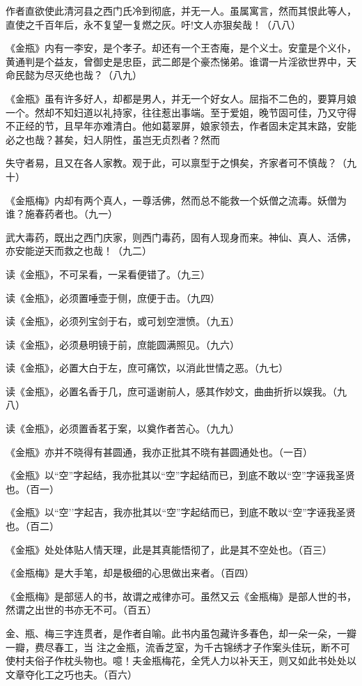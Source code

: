 \begin{showcontents}{}
{作者直欲使此清河县之西门氏冷到彻底，并无一人。虽属寓言，然而其恨此等人，直使之千百年后，永不复望一复燃之灰。吁!文人亦狠矣哉！（八八）

《金瓶》内有一李安，是个孝子。却还有一个王杏庵，是个义士。安童是个义仆，黄通判是个益友，曾御史是忠臣，武二郎是个豪杰悌弟。谁谓一片淫欲世界中，天命民懿为尽灭绝也哉？（八九）

《金瓶》虽有许多好人，却都是男人，并无一个好女人。屈指不二色的，要算月娘一个。然却不知妇道以礼持家，往往惹出事端。至于爱姐，晚节固可佳，乃又守得不正经的节，且早年亦难清白。他如葛翠屏，娘家领去，作者固未定其末路，安能必之也哉？甚矣，妇人阴性，虽岂无贞烈者？然而

失守者易，且又在各人家教。观于此，可以禀型于之惧矣，齐家者可不慎哉？（九十）

《金瓶梅》内却有两个真人，一尊活佛，然而总不能救一个妖僧之流毒。妖僧为谁？施春药者也。（九一）

武大毒药，既出之西门庆家，则西门毒药，固有人现身而来。神仙、真人、活佛，亦安能逆天而救之也哉！（九二）

读《金瓶》，不可呆看，一呆看便错了。（九三）

读《金瓶》，必须置唾壶于侧，庶便于击。（九四）

读《金瓶》，必须列宝剑于右，或可划空泄愤。（九五）

读《金瓶》，必须悬明镜于前，庶能圆满照见。（九六）

读《金瓶》，必置大白于左，庶可痛饮，以消此世情之恶。（九七）

读《金瓶》，必置名香于几，庶可遥谢前人，感其作妙文，曲曲折折以娱我。（九八）

读《金瓶》，必须置香茗于案，以奠作者苦心。（九九）

《金瓶》亦并不晓得有甚圆通，我亦正批其不晓有甚圆通处也。（一百）

《金瓶》以“空”字起结，我亦批其以“空”字起结而已，到底不敢以“空”字诬我圣贤也。（百一）

《金瓶》以“空’’字起吉，我亦批其以“空”字起结而已，到底不敢以“空”字诬我圣贤也。（百二）

《金瓶》处处体贴人情天理，此是其真能悟彻了，此是其不空处也。（百三）

《金瓶梅》是大手笔，却是极细的心思做出来者。（百四）

《金瓶梅》是部惩人的书，故谓之戒律亦可。虽然又云《金瓶梅》是部人世的书，然谓之出世的书亦无不可。（百五）

金、瓶、梅三字连贯者，是作者自喻。此书内虽包藏许多春色，却一朵一朵，一瓣一瓣，费尽春工，当
注之金瓶，流香芝室，为千古锦绣才子作案头佳玩，断不可使村夫俗子作枕头物也。噫！夫金瓶梅花，全凭人力以补天王，则又如此书处处以文章夺化工之巧也夫。（百六）

}
\end{showcontents}

